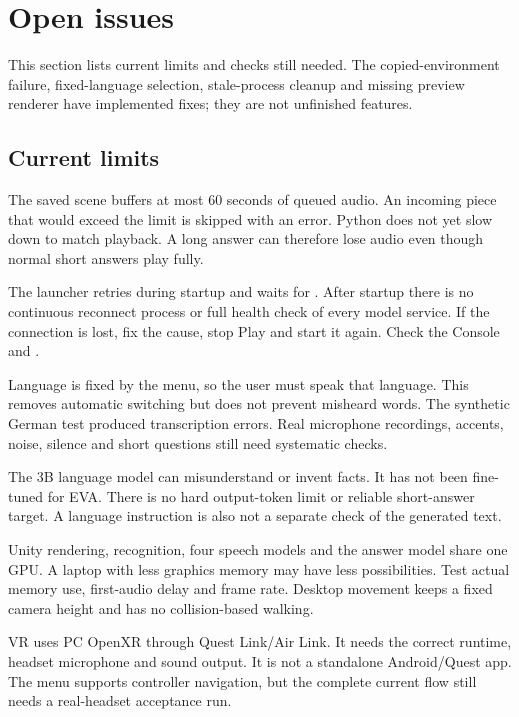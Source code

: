 \section{Open issues}
This section lists current limits and checks still needed. The copied-environment
failure, fixed-language selection, stale-process cleanup and missing preview
renderer have implemented fixes; they are not unfinished features.

\subsection{Current limits}
The saved scene buffers at most 60 seconds of queued audio. An incoming piece that would exceed the limit is skipped with an
error. Python does not yet slow down to match playback. A long answer can therefore
lose audio even though normal short answers play fully.

The launcher retries during startup and waits for . After
startup there is no continuous reconnect process or full health check of every
model service. If the connection is lost, fix the cause, stop Play and start it
again. Check the Console and .

Language is fixed by the menu, so the user must speak that language. This removes
automatic switching but does not prevent misheard words. The synthetic German
test produced transcription errors. Real microphone recordings, accents, noise,
silence and short questions still need systematic checks.

The 3B language model can misunderstand or invent facts. It has not been
fine-tuned for EVA. There is no hard output-token limit or reliable short-answer
target. A language instruction is also not a separate check of the generated text.

Unity rendering, recognition, four speech models and the answer model share one
GPU. A laptop with less graphics memory may have less possibilities. Test actual
memory use, first-audio delay and frame rate. Desktop movement keeps a fixed
camera height and has no collision-based walking.

VR uses PC OpenXR through Quest Link/Air Link. It needs the correct runtime,
headset microphone and sound output. It is not a standalone Android/Quest app.
The menu supports controller navigation, but the complete current flow still
needs a real-headset acceptance run.

